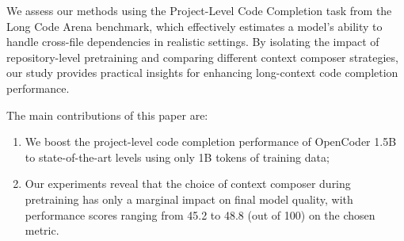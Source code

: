We assess our methods using the Project-Level Code Completion task from the Long Code Arena benchmark, which effectively estimates a model’s ability to handle cross-file dependencies in realistic settings. By isolating the impact of repository-level pretraining and comparing different context composer strategies, our study provides practical insights for enhancing long-context code completion performance.

The main contributions of this paper are:
\begin{enumerate}
    \item We boost the project-level code completion performance of OpenCoder 1.5B to state-of-the-art levels using only 1B tokens of training data;
    \item Our experiments reveal that the choice of context composer during pretraining has only a marginal impact on final model quality, with performance scores ranging from 45.2 to 48.8 (out of 100) on the chosen metric.
\end{enumerate}
